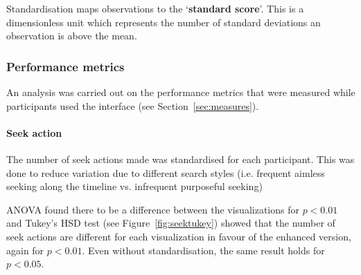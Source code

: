 Standardisation maps observations to the `\textbf{standard score}'. This is a
dimensionless unit which represents the number of standard deviations an
observation is above the mean.

\subsubsection{Performance metrics}\label{sec:studymetrics}
An analysis was carried out on the performance metrics that were measured while
participants used the interface (see Section~\ref{sec:measures}).

\paragraph{Seek action}
The number of seek actions made was standardised for each participant. This was
done to reduce variation due to different search styles (i.e. frequent aimless
seeking along the timeline vs. infrequent purposeful seeking)

ANOVA found there to be a difference between the visualizations for $p < 0.01$
and Tukey's HSD test (see Figure~\ref{fig:seektukey}) showed that the number of
seek actions are different for each visualization in favour of the enhanced
version, again for $p < 0.01$. Even without standardisation, the same result
holds for $p < 0.05$.

